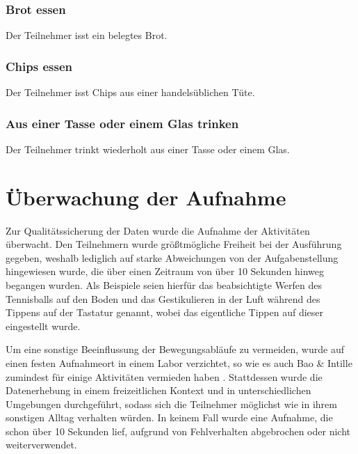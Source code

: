 \subsubsection{Brot essen}
Der Teilnehmer isst ein belegtes Brot.
\subsubsection{Chips essen}
Der Teilnehmer isst Chips aus einer handelsüblichen Tüte.
\subsubsection{Aus einer Tasse oder einem Glas trinken}
Der Teilnehmer trinkt wiederholt aus einer Tasse oder einem Glas.

\newpage

\section{Überwachung der Aufnahme}
Zur Qualitätssicherung der Daten wurde die Aufnahme der Aktivitäten überwacht. Den Teilnehmern wurde größtmögliche Freiheit bei der Ausführung gegeben, weshalb lediglich auf starke Abweichungen von der Aufgabenstellung hingewiesen wurde, die über einen Zeitraum von über 10 Sekunden hinweg begangen wurden. Als Beispiele seien hierfür das beabsichtigte Werfen des Tennisballs auf den Boden und das Gestikulieren in der Luft während des Tippens auf der Tastatur genannt, wobei das eigentliche Tippen auf dieser eingestellt wurde.

Um eine sonstige Beeinflussung der Bewegungsabläufe zu vermeiden, wurde auf einen festen Aufnahmeort in einem Labor verzichtet, so wie es auch Bao \& Intille zumindest für einige Aktivitäten vermieden haben \cite{Bao2004}. Stattdessen wurde die Datenerhebung in einem freizeitlichen Kontext und in unterschiedlichen Umgebungen durchgeführt, sodass sich die Teilnehmer möglichst wie in ihrem sonstigen Alltag verhalten würden. In keinem Fall wurde eine Aufnahme, die schon über 10 Sekunden lief, aufgrund von Fehlverhalten abgebrochen oder nicht weiterverwendet.


